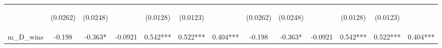 \documentclass[]{article}
\begin{document}
\begin{center}
\begin{tabular}{lcccccccccccc}
\vspace{4pt} & \begin{footnotesize}(0.0262)\end{footnotesize} & \begin{footnotesize}(0.0248)\end{footnotesize} & \begin{footnotesize}\end{footnotesize} & \begin{footnotesize}(0.0128)\end{footnotesize} & \begin{footnotesize}(0.0123)\end{footnotesize} & \begin{footnotesize}\end{footnotesize} & \begin{footnotesize}(0.0262)\end{footnotesize} & \begin{footnotesize}(0.0248)\end{footnotesize} & \begin{footnotesize}\end{footnotesize} & \begin{footnotesize}(0.0128)\end{footnotesize} & \begin{footnotesize}(0.0123)\end{footnotesize} & \begin{footnotesize}\end{footnotesize} \\
m\_D\_wins & -0.198 & -0.363* & -0.0921 & 0.542*** & 0.522*** & 0.404*** & -0.198 & -0.363* & -0.0921 & 0.542*** & 0.522*** & 0.404*** \\

\end{tabular}
\end{center}
\end{document}
